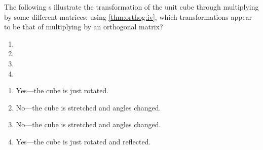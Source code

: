 \begin{example} \label{eg:}
The following s illustrate the transformation of the unit cube through multiplying by some different matrices: using \autoref{thm:orthog:iv}, which transformations appear to be that of multiplying by an orthogonal matrix?
\begin{enumerate}
\item {}

\item {}

\def\unithousesize{small}
\item {}

%
%

\def\unithousesize{small}
\item {}
\end{enumerate}

\begin{solution} 
\begin{enumerate}
\item Yes---the cube is just rotated.
\item No---the cube is stretched and angles changed.
\item No---the cube is stretched and angles changed.
\item Yes---the cube is just rotated and reflected.
\end{enumerate}
\end{solution}
\end{example}









